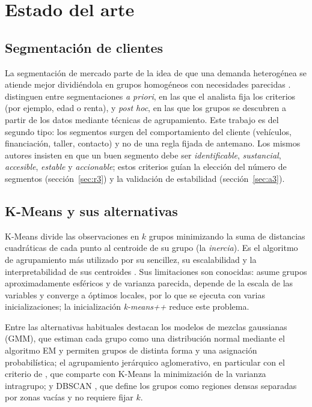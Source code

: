 \documentclass[11pt,a4paper]{article}
\begin{document}
\section{Estado del arte}\label{sec:arte}

\subsection{Segmentación de clientes}

La segmentación de mercado parte de la idea de que una demanda heterogénea se atiende mejor dividiéndola en grupos
homogéneos con necesidades parecidas \parencite{smith1956}. \textcite{wedel2000} distinguen entre segmentaciones
\emph{a priori}, en las que el analista fija los criterios (por ejemplo, edad o renta), y \emph{post hoc}, en las que
los grupos se descubren a partir de los datos mediante técnicas de agrupamiento. Este trabajo es del segundo tipo: los
segmentos surgen del comportamiento del cliente (vehículos, financiación, taller, contacto) y no de una regla fijada de
antemano. Los mismos autores insisten en que un buen segmento debe ser \emph{identificable}, \emph{sustancial},
\emph{accesible}, \emph{estable} y \emph{accionable}; estos criterios guían la elección del número de segmentos
(sección~\ref{sec:r3}) y la validación de estabilidad (sección~\ref{sec:a3}).

\subsection{K-Means y sus alternativas}

K-Means \parencite{macqueen1967,lloyd1982} divide las observaciones en $k$ grupos minimizando la suma de distancias
cuadráticas de cada punto al centroide de su grupo (la \emph{inercia}). Es el algoritmo de agrupamiento más utilizado por
su sencillez, su escalabilidad y la interpretabilidad de sus centroides \parencite{jain2010,steinley2006}. Sus
limitaciones son conocidas: asume grupos aproximadamente esféricos y de varianza parecida, depende de la escala de las
variables y converge a óptimos locales, por lo que se ejecuta con varias inicializaciones; la inicialización
\emph{k-means++} \parencite{arthur2007} reduce este problema.

Entre las alternativas habituales destacan los modelos de mezclas gaussianas (GMM), que estiman cada grupo como una
distribución normal mediante el algoritmo EM \parencite{dempster1977} y permiten grupos de distinta forma y una
asignación probabilística; el agrupamiento jerárquico aglomerativo, en particular con el criterio de \textcite{ward1963},
que comparte con K-Means la minimización de la varianza intragrupo; y DBSCAN \parencite{ester1996}, que define los
grupos como regiones densas separadas por zonas vacías y no requiere fijar $k$.
\end{document}
